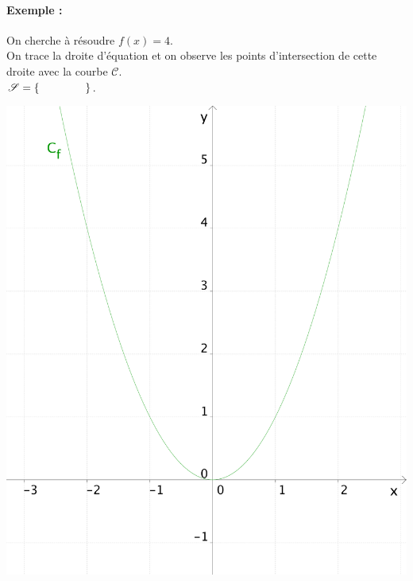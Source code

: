 \paragraph{Exemple :} 
\begin{minipage}[t]{0.55\linewidth}
  On cherche à résoudre $f(x)=4$. \\
  On trace la droite d'équation \hspace{1.5cm} et
  on observe les points d'intersection de cette droite avec la courbe
  $\mathscr{C}$. \\[1ex]
  $\mathscr{S}=\{\hspace{1.5cm}\}$. 
\end{minipage}
\qquad
\begin{minipage}[c]{0.25\linewidth}
  \includegraphics[width=\textwidth]{F_reseq_f.pdf}
\end{minipage}

\pagebreak[4]

\noindent
{} \\[1em]

